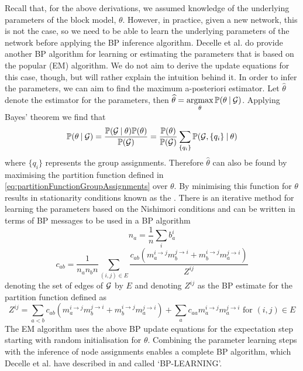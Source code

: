 Recall that, for the above derivations, we assumed knowledge of the underlying parameters of the block model, $\theta$.
However, in practice, given a new network, this is not the case, so we need to be able to learn the underlying parameters of the network before applying the BP inference algorithm.
Decelle et al. \cite{DKM+13} do provide another BP algorithm for learning or estimating the parameters that is based on the popular  (EM) algorithm.
We do not aim to derive the update equations for this case, though, but will rather explain the intuition behind it.
In order to infer the parameters, we can aim to find the maximum a-posteriori estimator.
Let $\widehat{\theta}$ denote the estimator for the parameters, then $\widehat{\theta} = \argmax_{\theta} \probability{\theta \given \graphvar{G}}$.
Applying Bayes' theorem we find that
\begin{equation}
	\label{eq:inferenceParametersBayesTheorem}
	\mathbb{P}(\theta \:\lvert\: \mathcal G) = \frac{\mathbb{P}(\mathcal G \:\lvert\: \theta) \mathbb{P}(\theta)}{\mathbb{P}(\mathcal G)} = \frac{\mathbb{P}(\theta)}{\mathbb{P}(\mathcal G)} \sum_{\{ q_{i} \}} \mathbb{P}(\mathcal G,\{q_{i}\} \:\lvert\: \theta) 
\end{equation}
where $\{ q_{i} \}$ represents the group assignments.
Therefore $\widehat{\theta}$ can also be found by maximising the partition function defined in \cref{eq:partitionFunctionGroupAssignments} over $\theta$.
By minimising this function for $\theta$ results in stationarity conditions known as the  \cite{DKM+13}.
There is an iterative method for learning the parameters based on the Nishimori conditions and can be written in terms of BP messages to be used in a BP algorithm
\begin{equation}
	\label{eq:inferenceParametersBPMessage1}
	n_{a} = \frac{1}{n} \sum_{i} b_{a}^{i}
\end{equation}
\begin{equation}
	\label{eq:inferenceParametersBPMessage2}
	c_{ab} = \frac{1}{n_{a} n_{b} n} \sum_{(i,j) \in E} \frac{c_{ab} (m_{a}^{i \rightarrow j}m_{b}^{j \rightarrow i} + m_{b}^{i \rightarrow j}m_{a}^{j \rightarrow i})}{Z^{ij}}
\end{equation}
denoting the set of edges of $\mathcal G$ by $E$ and denoting $Z^{ij}$ as the BP estimate for the partition function defined as
\begin{equation}
	\label{eq:partitionFunctionBPEstimate}
	Z^{ij} = \sum_{a<b} c_{ab} (m_{a}^{i \rightarrow j}m_{b}^{j \rightarrow i} + m_{b}^{i \rightarrow j}m_{a}^{j \rightarrow i}) + \sum_{a} c_{aa} m_{a}^{i \rightarrow j} m_{a}^{j \rightarrow i} \text{ for } (i,j) \in E
\end{equation}
The EM algorithm uses the above BP update equations for the expectation step starting with random initialisation for $\theta$.
Combining the parameter learning steps with the inference of node assignments enables a complete BP algorithm, which Decelle et al. have described in \cite{DKM+13} and called `\textsc{BP-LEARNING}'.

